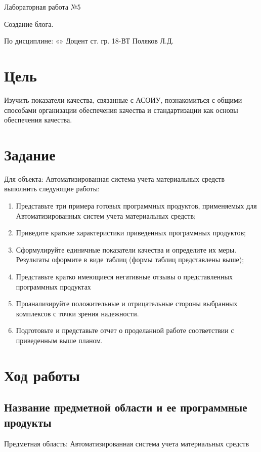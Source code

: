 \documentclass[14pt]{extarticle}
\let\oldsection\section
\renewcommand\section{\clearpage\oldsection}
\begin{document}
\unititle
{\klgtu}
{\fapu}
{\suvt}
{ Лабораторная работа №5 \par Создание блога. }
{По дисциплине: «»}
{Доцент}
{}
{ст. гр. 18-ВТ}
{Поляков Л.Д.}

\tableofcontents

\section{Цель}

Изучить показатели качества, связанные с АСОИУ, познакомиться с общими способами организации обеспечения качества и стандартизации как основы обеспечения качества.

\section{Задание}

Для объекта: Автоматизированная система учета материальных средств выполнить следующие работы:
\begin{enumerate}

	\item Представьте три примера готовых программных продуктов, применяемых для Автоматизированных систем учета материальных средств;
	\item Приведите краткие характеристики приведенных программных продуктов;
	\item Сформулируйте единичные показатели качества и определите их меры. Результаты оформите в виде таблиц (формы таблиц представлены выше);
	\item Представьте кратко имеющиеся негативные отзывы о представленных программных продуктах
	\item Проанализируйте положительные и отрицательные стороны выбранных комплексов с точки зрения надежности. 
	\item Подготовьте и представьте отчет о проделанной работе соответствии с приведенным выше планом.
\end{enumerate}

\section{Ход работы}

\subsection{Название предметной области и ее программные продукты}

Предметная область: Автоматизированная система учета материальных средств
\end{document}
